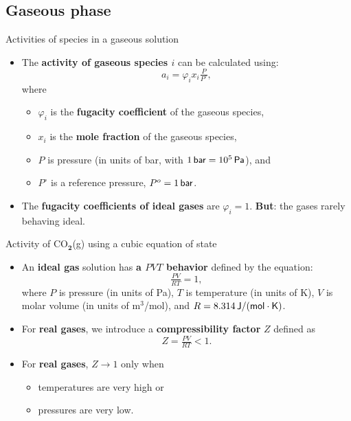 \subsection{Gaseous phase}
%
%
\begin{frame}{Activities of species in a gaseous solution}
\begin{itemize}
\item The \alert{\textbf{activity of gaseous species $i$}} can be calculated using:
\[
\boxed{a_{i}=\varphi_{i}x_{i}\tfrac{P}{P^{\circ}}},
\]
where 
\begin{itemize}
\item $\varphi_{i}$ is the \textbf{fugacity coefficient} of the gaseous species,
\item $x_{i}$ is the \textbf{mole fraction} of the gaseous species,
\item $P$ is pressure (in units of bar, with $\unit[1]{\mathsf{bar}}=\unit[10^{5}]{\mathsf{Pa}}$),
and 
\item $P^{\circ}$ is a reference pressure, $P^{\circ}=\unit[1]{\mathsf{bar}}$.
\end{itemize}
\pause
\item The \textbf{fugacity coefficients of ideal gases} are $\varphi_{i}=1$. \textbf{But}: the gases rarely behaving ideal.  
\end{itemize}
\end{frame}
%
%
\begin{frame}{Activity of CO$_{\boldsymbol{2}}$(g) using a cubic equation of state}
\begin{itemize}
\item An \textbf{ideal gas} solution has \alert{\textbf{a $PVT$ behavior}} defined by the equation:
\[
\tfrac{PV}{RT}=1,
\]
where $P$ is pressure (in units of Pa), $T$ is temperature (in units
of K), $V$ is molar volume (in units of m$^{3}$/mol), and $R=\unit[8.314]{\mathsf{J/(mol\cdot K)}}$.
\pause
\item For \textbf{real gases}, we introduce a \alert{\textbf{compressibility factor}} $Z$ defined as
%
\[
Z=\tfrac{PV}{RT} < 1.
\]
\pause
\item For \textbf{real gases}, $Z \to 1$ only when
\begin{itemize}
\item temperatures are very high or
\item pressures are very low.
\end{itemize}
\end{itemize}
\end{frame}
